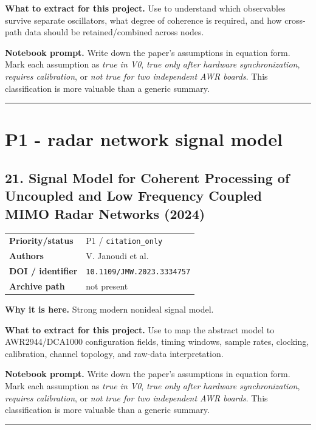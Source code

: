 \documentclass[10.5pt]{article}
\begin{document}
\textbf{What to extract for this project.} Use to understand which observables survive separate oscillators, what degree of coherence is required, and how cross-path data should be retained/combined across nodes.

\textbf{Notebook prompt.} Write down the paper's assumptions in equation form. Mark each assumption as \emph{true in V0}, \emph{true only after hardware synchronization}, \emph{requires calibration}, or \emph{not true for two independent AWR boards}. This classification is more valuable than a generic summary.

\vspace{0.35em}\hrule\vspace{0.65em}

\clearpage
\section{P1 - radar network signal model}

\subsection*{21. Signal Model for Coherent Processing of Uncoupled and Low Frequency Coupled MIMO Radar Networks (2024)}
\begin{tabularx}{\textwidth}{@{}p{}X@{}}
\textbf{Priority/status} & P1 / \nolinkurl{citation_only} \\
\textbf{Authors} & V. Janoudi et al. \\
\textbf{DOI / identifier} & \nolinkurl{10.1109/JMW.2023.3334757} \\
\textbf{Archive path} & not present \\
\end{tabularx}
\textbf{Why it is here.} Strong modern nonideal signal model.

\textbf{What to extract for this project.} Use to map the abstract model to AWR2944/DCA1000 configuration fields, timing windows, sample rates, clocking, calibration, channel topology, and raw-data interpretation.

\textbf{Notebook prompt.} Write down the paper's assumptions in equation form. Mark each assumption as \emph{true in V0}, \emph{true only after hardware synchronization}, \emph{requires calibration}, or \emph{not true for two independent AWR boards}. This classification is more valuable than a generic summary.

\vspace{0.35em}\hrule\vspace{0.65em}
\end{document}
